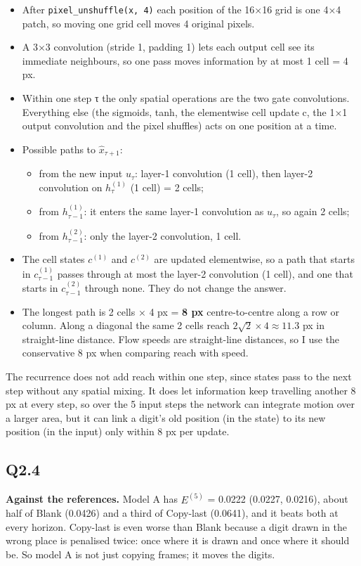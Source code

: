 \documentclass[11pt]{article}
\providecommand{\tightlist}{}
\newcounter{none} %
\begin{document}
\begin{itemize}
\item
  After \texttt{pixel\_unshuffle(x,\ 4)} each position of the 16×16 grid is one 4×4 patch, so moving one grid cell moves 4 original pixels.
\item
  A 3×3 convolution (stride 1, padding 1) lets each output cell see its immediate neighbours, so one pass moves information by at most 1 cell = 4 px.
\item
  Within one step τ the only spatial operations are the two gate convolutions. Everything else (the sigmoids, tanh, the elementwise cell update c, the 1×1 output convolution and the pixel shuffles) acts on one position at a time.
\item
  Possible paths to \(\hat{x}_{\tau+1}\):

  \begin{itemize}
  \tightlist
  \item
    from the new input \(u_\tau\): layer-1 convolution (1 cell), then layer-2 convolution on \(h^{(1)}_{\tau}\) (1 cell) = 2 cells;
  \item
    from \(h^{(1)}_{\tau-1}\): it enters the same layer-1 convolution as \(u_\tau\), so again 2 cells;
  \item
    from \(h^{(2)}_{\tau-1}\): only the layer-2 convolution, 1 cell.
  \end{itemize}
\item
  The cell states \(c^{(1)}\) and \(c^{(2)}\) are updated elementwise, so a path that starts in \(c^{(1)}_{\tau-1}\) passes through at most the layer-2 convolution (1 cell), and one that starts in \(c^{(2)}_{\tau-1}\) through none. They do not change the answer.
\item
  The longest path is 2 cells × 4 px = \textbf{8 px} centre-to-centre along a row or column. Along a diagonal the same 2 cells reach \(2\sqrt{2} \times 4 \approx 11.3\) px in straight-line distance. Flow speeds are straight-line distances, so I use the conservative 8 px when comparing reach with speed.
\end{itemize}

The recurrence does not add reach within one step, since states pass to the next step without any spatial mixing. It does let information keep travelling another 8 px at every step, so over the 5 input steps the network can integrate motion over a larger area, but it can link a digit's old position (in the state) to its new position (in the input) only within 8 px per update.


\subsection*{Q2.4}
\textbf{Against the references.} Model A has \(E^{(5)}\) = 0.0222 (0.0227, 0.0216), about half of Blank (0.0426) and a third of Copy-last (0.0641), and it beats both at every horizon. Copy-last is even worse than Blank because a digit drawn in the wrong place is penalised twice: once where it is drawn and once where it should be. So model A is not just copying frames; it moves the digits.
\end{document}
